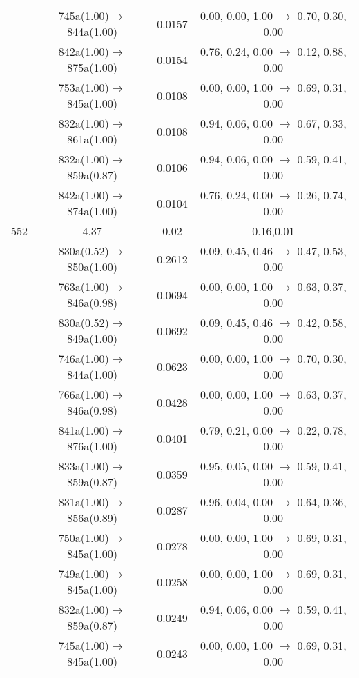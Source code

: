 \documentclass[10pt,a4paper]{article}
\begin{document}
\begin{longtable}{c|c|c|c}
 	& 745a(1.00)$\rightarrow$844a(1.00) &	 0.0157 &	 0.00, 0.00, 1.00 $\rightarrow$ 0.70, 0.30, 0.00 \\ 
 	& 842a(1.00)$\rightarrow$875a(1.00) &	 0.0154 &	 0.76, 0.24, 0.00 $\rightarrow$ 0.12, 0.88, 0.00 \\ 
 	& 753a(1.00)$\rightarrow$845a(1.00) &	 0.0108 &	 0.00, 0.00, 1.00 $\rightarrow$ 0.69, 0.31, 0.00 \\ 
 	& 832a(1.00)$\rightarrow$861a(1.00) &	 0.0108 &	 0.94, 0.06, 0.00 $\rightarrow$ 0.67, 0.33, 0.00 \\ 
 	& 832a(1.00)$\rightarrow$859a(0.87) &	 0.0106 &	 0.94, 0.06, 0.00 $\rightarrow$ 0.59, 0.41, 0.00 \\ 
 	& 842a(1.00)$\rightarrow$874a(1.00) &	 0.0104 &	 0.76, 0.24, 0.00 $\rightarrow$ 0.26, 0.74, 0.00 \\ 
 \hline552 &	 4.37 &	 0.02 &	 0.16,0.01 \\ 
  	& 830a(0.52)$\rightarrow$850a(1.00) &	 0.2612 &	 0.09, 0.45, 0.46 $\rightarrow$ 0.47, 0.53, 0.00 \\ 
 	& 763a(1.00)$\rightarrow$846a(0.98) &	 0.0694 &	 0.00, 0.00, 1.00 $\rightarrow$ 0.63, 0.37, 0.00 \\ 
 	& 830a(0.52)$\rightarrow$849a(1.00) &	 0.0692 &	 0.09, 0.45, 0.46 $\rightarrow$ 0.42, 0.58, 0.00 \\ 
 	& 746a(1.00)$\rightarrow$844a(1.00) &	 0.0623 &	 0.00, 0.00, 1.00 $\rightarrow$ 0.70, 0.30, 0.00 \\ 
 	& 766a(1.00)$\rightarrow$846a(0.98) &	 0.0428 &	 0.00, 0.00, 1.00 $\rightarrow$ 0.63, 0.37, 0.00 \\ 
 	& 841a(1.00)$\rightarrow$876a(1.00) &	 0.0401 &	 0.79, 0.21, 0.00 $\rightarrow$ 0.22, 0.78, 0.00 \\ 
 	& 833a(1.00)$\rightarrow$859a(0.87) &	 0.0359 &	 0.95, 0.05, 0.00 $\rightarrow$ 0.59, 0.41, 0.00 \\ 
 	& 831a(1.00)$\rightarrow$856a(0.89) &	 0.0287 &	 0.96, 0.04, 0.00 $\rightarrow$ 0.64, 0.36, 0.00 \\ 
 	& 750a(1.00)$\rightarrow$845a(1.00) &	 0.0278 &	 0.00, 0.00, 1.00 $\rightarrow$ 0.69, 0.31, 0.00 \\ 
 	& 749a(1.00)$\rightarrow$845a(1.00) &	 0.0258 &	 0.00, 0.00, 1.00 $\rightarrow$ 0.69, 0.31, 0.00 \\ 
 	& 832a(1.00)$\rightarrow$859a(0.87) &	 0.0249 &	 0.94, 0.06, 0.00 $\rightarrow$ 0.59, 0.41, 0.00 \\ 
 	& 745a(1.00)$\rightarrow$845a(1.00) &	 0.0243 &	 0.00, 0.00, 1.00 $\rightarrow$ 0.69, 0.31, 0.00 \\ 

\end{longtable}
\end{document}
